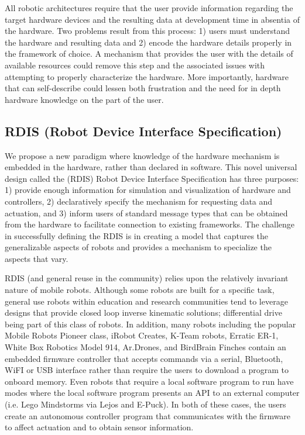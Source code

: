 All robotic architectures require that the user provide information regarding the target hardware devices and the resulting data at development time in absentia of the hardware.  Two problems result from this process: 1) users must understand the hardware and resulting data and 2) encode the hardware details properly in the framework of choice.   A mechanism that provides the user with the details of available resources could remove this step and the associated issues with attempting to properly characterize the hardware.  More importantly, hardware that can self-describe could lessen both frustration and the need for in depth hardware knowledge on the part of the user.  

\subsection{RDIS (Robot Device Interface Specification)}
We propose a new paradigm where knowledge of the hardware mechanism is embedded in the hardware, rather than declared in software.  This novel universal design called the (RDIS) Robot Device Interface Specification has three purposes: 1) provide enough information for simulation and visualization of hardware and controllers, 2) declaratively specify the mechanism for requesting data and actuation, and 3) inform users of standard message types that can be obtained from the hardware to facilitate connection to existing frameworks.  The challenge in successfully defining the RDIS is in creating a model that captures the generalizable aspects of robots and provides a mechanism to specialize the aspects that vary.

RDIS (and general reuse in the community) relies upon the relatively invariant nature of mobile robots.  Although some robots are built for a specific task, general use robots within education and research communities tend to leverage designs that provide closed loop inverse kinematic solutions; differential drive being part of this class of robots.  In addition, many robots including the popular Mobile Robots Pioneer class, iRobot Creates, K-Team robots, Erratic ER-1, White Box Robotics Model 914, Ar.Drones, and BirdBrain Finches contain an embedded firmware controller that accepts commands via a serial, Bluetooth, WiFI or USB interface rather than require the users to download a program to onboard memory.  Even robots that require a local software program to run have modes where the local software program presents an API to an external computer (i.e. Lego Mindstorms via Lejos and E-Puck).  In both of these cases, the users create an autonomous controller program that communicates with the firmware to affect actuation and to obtain sensor information.  


